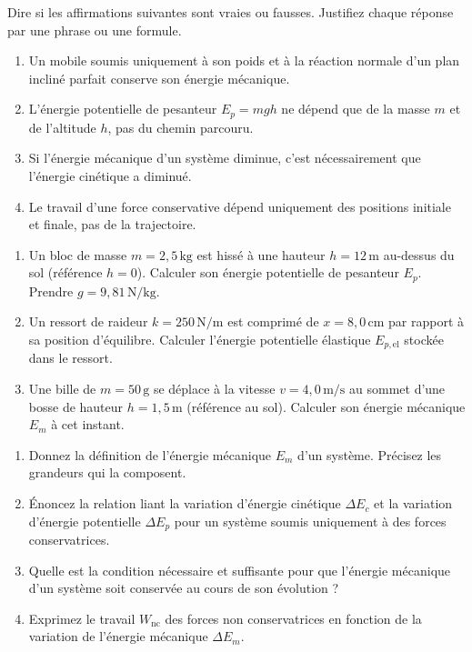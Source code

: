\documentclass[11pt]{article}
\begin{document}
\begin{exercice}
Dire si les affirmations suivantes sont vraies ou fausses. Justifiez chaque réponse par une phrase ou une formule.
\begin{enumerate}
    \item Un mobile soumis uniquement à son poids et à la réaction normale d'un plan incliné parfait conserve son énergie mécanique.
    \item L'énergie potentielle de pesanteur $E_p = mgh$ ne dépend que de la masse $m$ et de l'altitude $h$, pas du chemin parcouru.
    \item Si l'énergie mécanique d'un système diminue, c'est nécessairement que l'énergie cinétique a diminué.
    \item Le travail d'une force conservative dépend uniquement des positions initiale et finale, pas de la trajectoire.
\end{enumerate}
\end{exercice}

\begin{exercice}
\begin{enumerate}
    \item Un bloc de masse $m = 2,5\,\text{kg}$ est hissé à une hauteur $h = 12\,\text{m}$ au-dessus du sol (référence $h=0$). Calculer son énergie potentielle de pesanteur $E_p$. Prendre $g = 9,81\,\text{N/kg}$.
    \item Un ressort de raideur $k = 250\,\text{N/m}$ est comprimé de $x = 8,0\,\text{cm}$ par rapport à sa position d'équilibre. Calculer l'énergie potentielle élastique $E_{p,\text{el}}$ stockée dans le ressort.
    \item Une bille de $m = 50\,\text{g}$ se déplace à la vitesse $v = 4,0\,\text{m/s}$ au sommet d'une bosse de hauteur $h = 1,5\,\text{m}$ (référence au sol). Calculer son énergie mécanique $E_m$ à cet instant.
\end{enumerate}
\end{exercice}

\begin{exercice}
\begin{enumerate}
    \item Donnez la définition de l'énergie mécanique $E_m$ d'un système. Précisez les grandeurs qui la composent.
    \item Énoncez la relation liant la variation d'énergie cinétique $\Delta E_c$ et la variation d'énergie potentielle $\Delta E_p$ pour un système soumis uniquement à des forces conservatrices.
    \item Quelle est la condition nécessaire et suffisante pour que l'énergie mécanique d'un système soit conservée au cours de son évolution ?
    \item Exprimez le travail $W_{\text{nc}}$ des forces non conservatrices en fonction de la variation de l'énergie mécanique $\Delta E_m$.
\end{enumerate}
\end{exercice}
\end{document}
